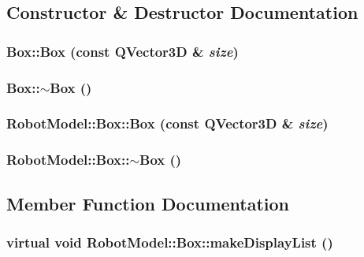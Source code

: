 \subsection{Constructor \& Destructor Documentation}
\hypertarget{class_robot_model_1_1_box_a4f394975b4dadbd1fa34d124f33772cb}{
\subsubsection[{Box}]{\setlength{\rightskip}{0pt plus 5cm}Box::Box (const QVector3D \& {\em size})}}
\label{class_robot_model_1_1_box_a4f394975b4dadbd1fa34d124f33772cb}
\hypertarget{class_robot_model_1_1_box_a6a5e09398e85d602a046b429062fb9c2}{
\subsubsection[{$\sim$Box}]{\setlength{\rightskip}{0pt plus 5cm}Box::$\sim$Box ()}}
\label{class_robot_model_1_1_box_a6a5e09398e85d602a046b429062fb9c2}
\hypertarget{class_robot_model_1_1_box_a045eb20c935ee6c2b35213c7163f2418}{
\subsubsection[{Box}]{\setlength{\rightskip}{0pt plus 5cm}RobotModel::Box::Box (const QVector3D \& {\em size})}}
\label{class_robot_model_1_1_box_a045eb20c935ee6c2b35213c7163f2418}
\hypertarget{class_robot_model_1_1_box_af171ccea0a183894859a77ed105aeff6}{
\subsubsection[{$\sim$Box}]{\setlength{\rightskip}{0pt plus 5cm}RobotModel::Box::$\sim$Box ()}}
\label{class_robot_model_1_1_box_af171ccea0a183894859a77ed105aeff6}


\subsection{Member Function Documentation}
\hypertarget{class_robot_model_1_1_box_a9499dafbda230821b419e3f578316d91}{
\subsubsection[{makeDisplayList}]{\setlength{\rightskip}{0pt plus 5cm}virtual void RobotModel::Box::makeDisplayList ()}}
\label{class_robot_model_1_1_box_a9499dafbda230821b419e3f578316d91}


